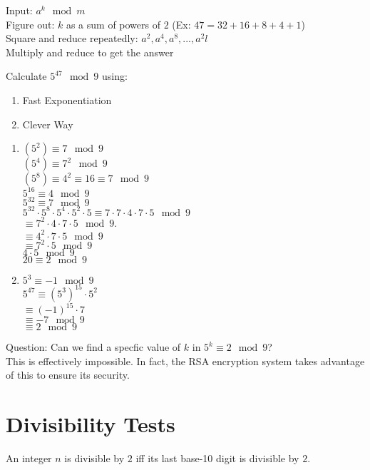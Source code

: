 Input: $a^k \mod{m}$
\\Figure out: $k$ as a sum of powers of $2$ (Ex: $47 = 32 + 16 + 8 + 4 + 1$)
\\Square and reduce repeatedly: $a^2, a^4, a^8, ..., a^2l$  
\\Multiply and reduce to get the answer
\\
\begin{example}
Calculate $5^{47} \mod{9}$ using:
\begin{enumerate}
\item Fast Exponentiation
\item Clever Way
\end{enumerate}

\begin{enumerate}
\item $(5^2) \equiv 7 \mod{9}$
\\$(5^4) \equiv 7^2 \mod{9}$
\\$(5^8) \equiv 4^2 \equiv 16 \equiv 7 \mod{9}$
\\$5^{16} \equiv 4 \mod{9}$
\\$5^{32} \equiv 7 \mod{9}$
\\$5^{32} \cdot 5^8 \cdot 5^4 \cdot 5^2 \cdot 5 \equiv 7 \cdot 7 \cdot 4 \cdot 7 \cdot 5 \mod{9}$
\\$ \equiv 7^2 \cdot 4 \cdot 7 \cdot 5 \mod{9}$.
\\$ \equiv 4^2 \cdot 7 \cdot 5 \mod{9}$
\\$ \equiv 7^2 \cdot 5 \mod{9}$
\\$ 4 \cdot 5 \mod{9}$
\\$ 20 \equiv 2 \mod{9}$
\\
\item $5^3 \equiv -1 \mod{9}$
\\$5^{47} \equiv (5^3)^{15} \cdot 5^2$
\\$ \equiv (-1)^{15} \cdot 7$
\\$ \equiv -7 \mod{9}$
\\$ \equiv 2 \mod{9}$
\end{enumerate}
\end{example}

Question: Can we find a specfic value of $k$ in $5^k \equiv 2 \mod{9}$?
\\This is effectively impossible. In fact, the RSA encryption system takes advantage of this to ensure its security.

\section{Divisibility Tests}
\begin{theorem}
An integer $n$ is divisible by $2$ iff its last base-10 digit is divisible by $2$.
\end{theorem}

